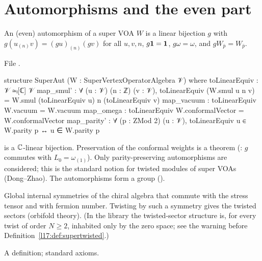 \section{Automorphisms and the even part}\label{l17:sec:aut}

\begin{definition}\label{l17:def:superaut}
An (even) automorphism of a super VOA $W$ is a linear bijection $g$ with
$g(u_{(n)}v)=(gu)_{(n)}(gv)$ for all $u,v,n$, $g\mathbf{1}=\mathbf{1}$, $g\omega=\omega$, and
$gW_{\bar p}=W_{\bar p}$.
\end{definition}
\noindent File .
\begin{leancode}
structure SuperAut (W : SuperVertexOperatorAlgebra 𝒱) where
  toLinearEquiv : 𝒱 ≃ₗ[ℂ] 𝒱
  map_smul' : ∀ (u : 𝒱) (n : ℤ) (v : 𝒱),
    toLinearEquiv (W.smul u n v) = W.smul (toLinearEquiv u) n (toLinearEquiv v)
  map_vacuum : toLinearEquiv W.vacuum = W.vacuum
  map_omega : toLinearEquiv W.conformalVector = W.conformalVector
  map_parity' : ∀ (p : ZMod 2) (u : 𝒱),
    toLinearEquiv u ∈ W.parity p ↔ u ∈ W.parity p
\end{leancode}
\begin{dictionary}
 is a ${\mathbb{C}}$-linear bijection. Preservation of the conformal weights is a theorem
(: $g$ commutes with $L_0=\omega_{(1)}$). Only parity-preserving automorphisms
are considered; this is the standard notion for twisted modules of super VOAs (Dong--Zhao). The
automorphisms form a group ().
\end{dictionary}
\begin{physics}
Global internal symmetries of the chiral algebra that commute with the stress tensor and with
fermion number. Twisting by such a symmetry gives the twisted sectors (orbifold theory). (In the
library the twisted-sector structure  is, for every twist of order $N\ge2$,
inhabited only by the zero space; see the warning before Definition~\ref{l17:def:supertwisted}.)
\end{physics}
\begin{status}
A definition; standard axioms.
\end{status}

